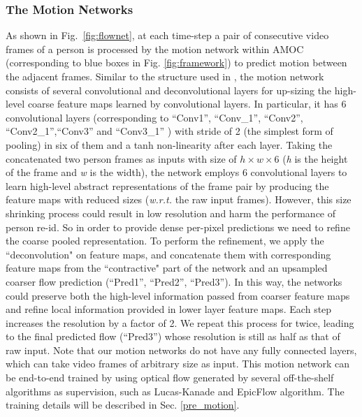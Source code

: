 \documentclass[journal]{IEEEtran}
\begin{document}
\subsubsection{The Motion Networks}\label{motion_net}
As shown in Fig.~\ref{fig:flownet}, at each time-step a pair of consecutive video frames of a person is processed by the motion network within AMOC (corresponding to blue boxes in Fig. \ref{fig:framework}) to predict motion between the adjacent frames. Similar to the structure used in \cite{dosovitskiy2015flownet}, the motion network consists of several convolutional and  deconvolutional layers for up-sizing the high-level coarse feature maps learned by convolutional layers. In particular, it has 6 convolutional layers (corresponding to ``Conv1'', ``Conv\_1'', ``Conv2'', ``Conv2\_1'',``Conv3'' and ``Conv3\_1'' ) with stride of 2 (the simplest form of pooling) in six of them and a tanh non-linearity after each layer.  Taking the concatenated two person frames as inputs with size of $h \times w \times 6$ (\textit{h} is the height of the frame and \textit{w} is the width), the network employs 6 convolutional layers  to learn high-level abstract representations of the frame pair by producing the feature maps with reduced sizes (\textit{w.r.t.} the raw input frames). However, this size shrinking process could result in low resolution and harm the performance of person re-id. So in order to provide dense per-pixel predictions we need to refine the coarse pooled representation.  To perform the refinement, we apply the ``deconvolution" on feature maps, and concatenate them with corresponding feature maps from the ``contractive" part of the network and an upsampled coarser flow prediction (``Pred1'', ``Pred2'', ``Pred3''). In this way, the networks could preserve both the high-level information passed from coarser feature maps and refine local information provided in lower layer feature maps. Each step increases the resolution by a factor of 2. We repeat this process for twice, leading to the final predicted flow (``Pred3'') whose resolution is still as half as that of raw input. Note that our motion networks do not have any fully connected layers, which can take video frames of arbitrary size as input. This motion network can be end-to-end trained by using optical flow generated by several off-the-shelf algorithms as supervision, such as Lucas-Kanade \cite{lucas1981iterative} and EpicFlow\cite{revaud2015epicflow} algorithm. The training details will be described in Sec. \ref{pre_motion}.
\end{document}
